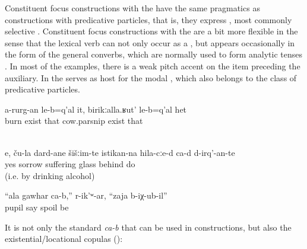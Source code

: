Constituent focus constructions with the  have the same pragmatics as constructions with predicative particles, that is, they express , most commonly selective . Constituent focus constructions with the  are a bit more flexible in the sense that the lexical verb can not only occur as a , but appears occasionally in the form of the general converbs, which are normally used to form analytic tenses . In most of the examples, there is a weak pitch accent on the item preceding the auxiliary. In  the  serves as host for the modal  , which also belongs to the class of predicative particles.


\begin{exe}
	\ex	\label{ex:There is the one that does not burn, the cow-parsnip@25}
	\gll	a-rurg-an	le-b=q'al	it,	birikːalla.ʁut'	le-b=q'al	het\\
		burn	exist	that	cow.parsnip	exist	that\\
	\glt	{}

	\\\label{ex:Yes, they resolve their sorrows BEHIND THE GLASS@25b}
	\gll	e,	ču-la	dard-ane	šišːim-te	istikan-na	hila-cːe-d	ca-d 		d-irq'-an-te\\
		yes		sorrow	suffering	glass	behind		 	do\\
	\glt	{} (i.e. by drinking alcohol)
	
		\ex	\label{ex:‎Your pupil is spoiled, she said}
	\gll	``ala	gawhar	ca-b,''	r-ik'ʷ-ar, ``zaja	b-iχ-ub-il''\\
			pupil		say	spoil	be\\
	\glt	{}
\end{exe}

It is not only the standard  \textit{ca-b} that can be used in  constructions, but also the existential/locational copulas ():

